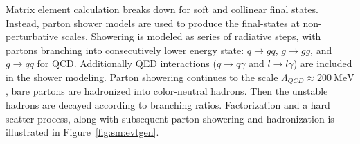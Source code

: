 

Matrix element calculation breaks down for soft and collinear final states. Instead, parton shower models are used to produce the final-states at non-perturbative scales. Showering is modeled as series of radiative steps, with partons branching into consecutively lower energy state: $q\rightarrow gq$, $g\rightarrow gg$, and $g\rightarrow q\bar{q}$ for QCD. Additionally QED interactions ($q\rightarrow q\gamma$ and $l\rightarrow l\gamma$) are included in the shower modeling. Parton showering continues to the scale $\Lambda_{QCD}\approx 200~\mathrm{MeV}$, bare partons are hadronized into color-neutral hadrons. Then the unstable hadrons are decayed according to branching ratios. Factorization and a hard scatter process, along with subsequent parton showering and hadronization is illustrated in Figure~\ref{fig:sm:evtgen}.



% 



